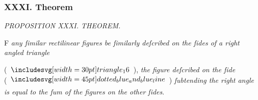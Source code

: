 \documentclass[11pt,preview]{standalone}
\begin{document}
\subsubsection{XXXI. Theorem}

\begin{minipage}[t]{0.43\textwidth}
    \vspace{20pt}
    
\end{minipage}%
\hfill
\begin{minipage}[t]{0.54\textwidth}
    \begin{center}
        \textit{PROPOSITION XXXI. THEOREM.}\label{book6pr31} \\
    \end{center}

    \hfill

    \begin{center}
        \raggedright \lettrine[lines=3, loversize=1, nindent=0pt]{}{}F \textit{any ſimilar rectilinear figures be ſimilarly deſcribed on the ſides of a right angled triangle}
    \end{center}
    \raggedright (\hspace{-1ex}$\img[0][0][30]{triangle_16}$\hspace{-1ex}), \textit{the figure deſcribed on the ſide}\\ (\hspace{-1ex}$\bimg{dotted_blue_and_blue_line}$\hspace{-1ex}) \textit{ſubtending the right angle is equal to the ſum of the figures on the other ſides}.
\end{minipage}%

\hfill

\hfill
\end{document}
